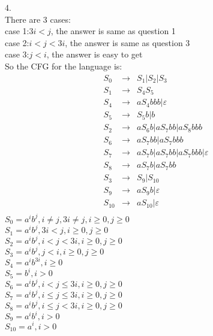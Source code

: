 \documentclass[a4paper]{article}
\begin{document}
4.\\
There are 3 cases:\\
case 1:$3i < j$, the answer is same as question 1\\
case 2:$i < j < 3i$, the answer is same as question 3\\
case 3:$j < i$, the answer is easy to get\\
So the CFG for the language is:\\
$$
\begin{array}{lcl}
S_0&\rightarrow&S_1|S_2|S_3\\

S_1&\rightarrow&S_4S_5\\
S_4&\rightarrow&aS_4bbb|\varepsilon\\
S_5&\rightarrow&S_5b|b\\

S_2&\rightarrow&aS_6b|aS_7bb|aS_8bbb\\
S_6&\rightarrow&aS_7bb|aS_7bbb\\
S_7&\rightarrow&aS_7b|aS_7bb|aS_7bbb|\varepsilon\\
S_8&\rightarrow&aS_7b|aS_7bb\\

S_3&\rightarrow&S_9|S_{10}\\
S_9&\rightarrow&aS_9b|\varepsilon\\
S_{10}&\rightarrow&aS_{10}|\varepsilon\\
\end{array}
$$
$S_0 = a^ib^j, i \neq j, 3i \neq j, i\geqslant0,j\geqslant0$\\
$S_1 = a^ib^j, 3i < j, i\geqslant0,j\geqslant0$\\
$S_2 = a^ib^j, i < j < 3i, i\geqslant0,j\geqslant0$\\
$S_3 = a^ib^j, j < i, i\geqslant0,j\geqslant0$\\
$S_4 = a^ib^{3i}, i\geqslant0$\\
$S_5 = b^i,i > 0$\\
$S_6 = a^ib^j, i < j \leqslant 3i, i\geqslant0,j\geqslant0$\\
$S_7 = a^ib^j, i\leqslant j \leqslant 3i, i\geqslant0,j\geqslant0$\\
$S_8 = a^ib^j, i\leqslant j < 3i, i\geqslant0,j\geqslant0$\\
$S_9 = a^ib^i,i > 0$\\
$S_{10} = a^i,i > 0$\\
\end{document}
